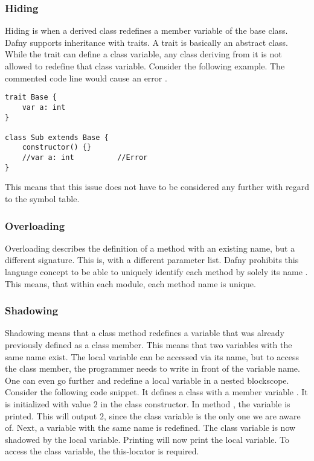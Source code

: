 \subsubsection{Hiding}
Hiding is when a derived class redefines a member variable of the base class.
Dafny supports inheritance with traits.
A trait is basically an abstract class.
While the trait can define a class variable, any class deriving from it is not allowed to redefine that class variable.
Consider the following example.
The commented code line would cause an error \cite{dafnyReferenceManual}.

\begin{lstlisting}[language=dafny, caption={Hiding}, captionpos=b, label={lst:hiding}]
trait Base {
    var a: int
}

class Sub extends Base {
    constructor() {}
    //var a: int          //Error
}
\end{lstlisting}

This means that this issue does not have to be considered any further with regard to the symbol table.

\subsubsection{Overloading}
Overloading describes the definition of a method with an existing name, but a different signature.
This is, with a different parameter list.
Dafny prohibits this language concept to be able to uniquely identify each method by solely its name \cite{dafnyReferenceManual}.
This means, that within each module, each method name is unique.

\subsubsection{Shadowing}

Shadowing means that a class method redefines a variable that was already previously defined as a class member.
This means that two variables with the same name exist.
The local variable can be accessed via its name, but to access the class member, the programmer needs to write  in front of the variable name.\\

One can even go further and redefine a local variable in a nested blockscope.
Consider the following code snippet.
It defines a class with a member variable .
It is initialized with value $2$ in the class constructor.
In method , the variable  is printed.
This will output $2$, since the class variable is the only one we are aware of.
Next, a variable with the same name is redefined.
The class variable is now shadowed by the local variable.
Printing  will now print the local variable.
To access the class variable, the this-locator is required.

